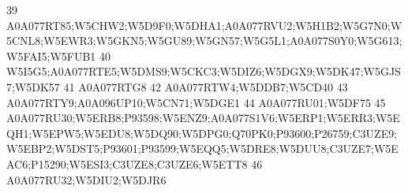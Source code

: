 \documentclass{beamer}
\begin{document}
\begin{frame}[fragile]
\begin{itemize}
\begin{Schunk}
\begin{Soutput}
39                                                                                                                                                                                                                                             A0A077RT85;W5CHW2;W5D9F0;W5DHA1;A0A077RVU2;W5H1B2;W5G7N0;W5CNL8;W5EWR3;W5GKN5;W5GU89;W5GN57;W5G5L1;A0A077S0Y0;W5G613;W5FAI5;W5FUB1
40                                                                                                                                                                                                                                                                                                             W5I5G5;A0A077RTE5;W5DMS9;W5CKC3;W5DIZ6;W5DGX9;W5DK47;W5GJS7;W5DK57
41                                                                                                                                                                                                                                                                                                                                                                     A0A077RTG8
42                                                                                                                                                                                                                                                                                                                                                       A0A077RTW4;W5DDB7;W5CD40
43                                                                                                                                                                                                                                                                                                                                            A0A077RTY9;A0A096UP10;W5CN71;W5DGE1
44                                                                                                                                                                                                                                                                                                                                                              A0A077RU01;W5DF75
45                                                                                                                                                      A0A077RU30;W5ERB8;P93598;W5ENZ9;A0A077S1V6;W5ERP1;W5ERR3;W5EQH1;W5EPW5;W5EDU8;W5DQ90;W5DPG0;Q70PK0;P93600;P26759;C3UZE9;W5EBP2;W5DST5;P93601;P93599;W5EQQ5;W5DRE8;W5DUU8;C3UZE7;W5EAC6;P15290;W5ESI3;C3UZE8;C3UZE6;W5ETT8
46                                                                                                                                                                                                                                                                                                                                                       A0A077RU32;W5DIU2;W5DJR6

\end{Soutput}
\end{Schunk}
\end{itemize}
\end{frame}
\end{document}
